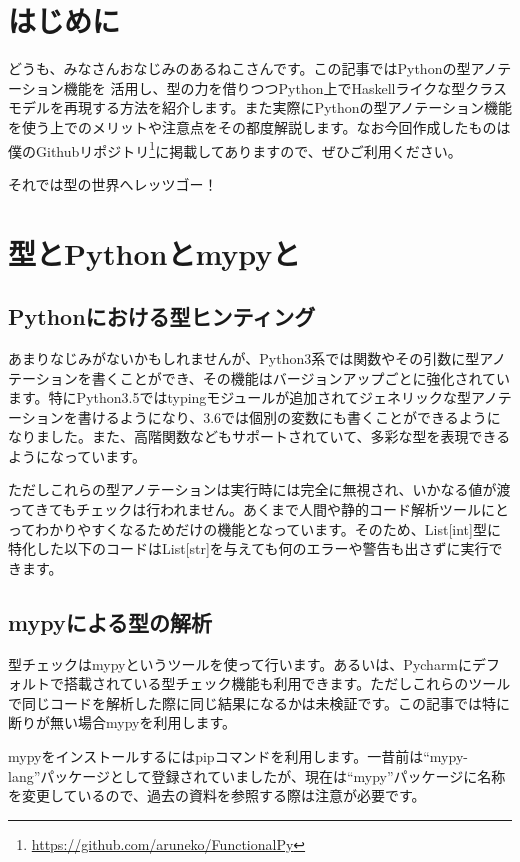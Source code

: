 \section{はじめに}
どうも、みなさんおなじみのあるねこさんです。この記事ではPythonの型アノテーション機能を
活用し、型の力を借りつつPython上でHaskellライクな型クラスモデルを再現する方法を紹介します。また実際にPythonの型アノテーション機能を使う上でのメリットや注意点をその都度解説します。なお今回作成したものは僕のGithubリポジトリ\footnote{\url{https://github.com/aruneko/FunctionalPy}}に掲載してありますので、ぜひご利用ください。

それでは型の世界へレッツゴー！

\section{型とPythonとmypyと}
\subsection{Pythonにおける型ヒンティング}
あまりなじみがないかもしれませんが、Python3系では関数やその引数に型アノテーションを書くことができ、その機能はバージョンアップごとに強化されています。特にPython3.5ではtypingモジュールが追加されてジェネリックな型アノテーションを書けるようになり、3.6では個別の変数にも書くことができるようになりました。また、高階関数などもサポートされていて、多彩な型を表現できるようになっています。

ただしこれらの型アノテーションは実行時には完全に無視され、いかなる値が渡ってきてもチェックは行われません。あくまで人間や静的コード解析ツールにとってわかりやすくなるためだけの機能となっています。そのため、List[int]型に特化した以下のコードはList[str]を与えても何のエラーや警告も出さずに実行できます。


\subsection{mypyによる型の解析}
型チェックはmypyというツールを使って行います。あるいは、Pycharmにデフォルトで搭載されている型チェック機能も利用できます。ただしこれらのツールで同じコードを解析した際に同じ結果になるかは未検証です。この記事では特に断りが無い場合mypyを利用します。

mypyをインストールするにはpipコマンドを利用します。一昔前は``mypy-lang''パッケージとして登録されていましたが、現在は``mypy''パッケージに名称を変更しているので、過去の資料を参照する際は注意が必要です。

